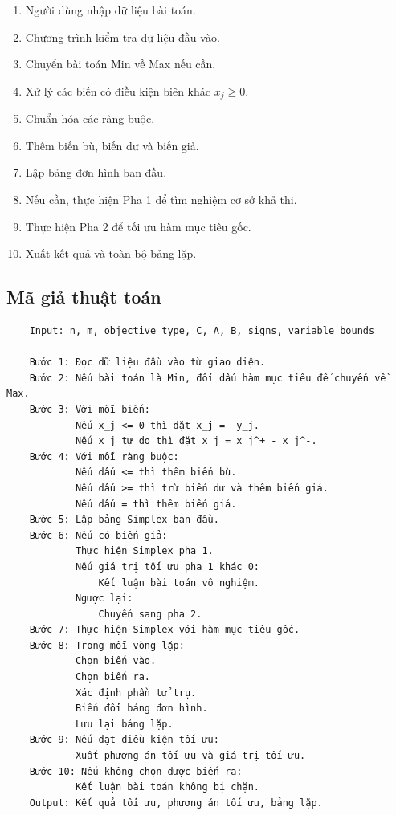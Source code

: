\documentclass[14pt, a4paper]{extarticle}
\begin{document}
    \begin{enumerate}
        \item Người dùng nhập dữ liệu bài toán.
        \item Chương trình kiểm tra dữ liệu đầu vào.
        \item Chuyển bài toán Min về Max nếu cần.
        \item Xử lý các biến có điều kiện biên khác $x_j \geq 0$.
        \item Chuẩn hóa các ràng buộc.
        \item Thêm biến bù, biến dư và biến giả.
        \item Lập bảng đơn hình ban đầu.
        \item Nếu cần, thực hiện Pha 1 để tìm nghiệm cơ sở khả thi.
        \item Thực hiện Pha 2 để tối ưu hàm mục tiêu gốc.
        \item Xuất kết quả và toàn bộ bảng lặp.
    \end{enumerate}
    
    \subsection{Mã giả thuật toán}
    
    \begin{verbatim}
    Input: n, m, objective_type, C, A, B, signs, variable_bounds
    
    Bước 1: Đọc dữ liệu đầu vào từ giao diện.
    Bước 2: Nếu bài toán là Min, đổi dấu hàm mục tiêu để chuyển về Max.
    Bước 3: Với mỗi biến:
            Nếu x_j <= 0 thì đặt x_j = -y_j.
            Nếu x_j tự do thì đặt x_j = x_j^+ - x_j^-.
    Bước 4: Với mỗi ràng buộc:
            Nếu dấu <= thì thêm biến bù.
            Nếu dấu >= thì trừ biến dư và thêm biến giả.
            Nếu dấu = thì thêm biến giả.
    Bước 5: Lập bảng Simplex ban đầu.
    Bước 6: Nếu có biến giả:
            Thực hiện Simplex pha 1.
            Nếu giá trị tối ưu pha 1 khác 0:
                Kết luận bài toán vô nghiệm.
            Ngược lại:
                Chuyển sang pha 2.
    Bước 7: Thực hiện Simplex với hàm mục tiêu gốc.
    Bước 8: Trong mỗi vòng lặp:
            Chọn biến vào.
            Chọn biến ra.
            Xác định phần tử trụ.
            Biến đổi bảng đơn hình.
            Lưu lại bảng lặp.
    Bước 9: Nếu đạt điều kiện tối ưu:
            Xuất phương án tối ưu và giá trị tối ưu.
    Bước 10: Nếu không chọn được biến ra:
            Kết luận bài toán không bị chặn.
    Output: Kết quả tối ưu, phương án tối ưu, bảng lặp.
    \end{verbatim}
    
\end{document}

